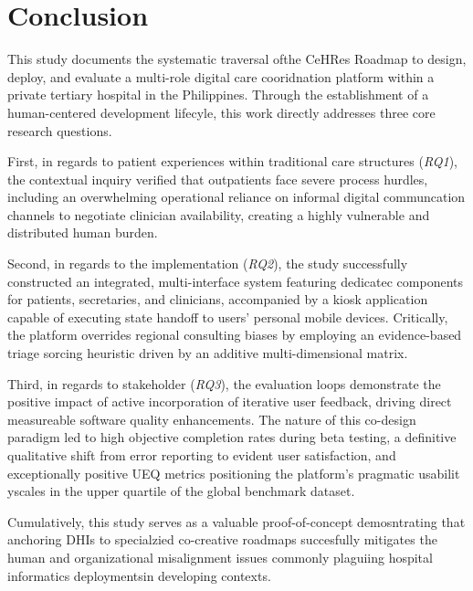 \documentclass[manuscript, screen, review]{acmart}
\begin{document}
\section{Conclusion}
\label{sec:conclusion}
This study documents the systematic traversal ofthe CeHRes Roadmap to design, deploy, and evaluate a multi-role digital care cooridnation platform within a private tertiary hospital in the Philippines. Through the establishment of a human-centered development lifecyle, this work directly addresses three core research questions. 

First, in regards to patient experiences within traditional care structures (\textit{RQ1}), the contextual inquiry verified that outpatients face severe process hurdles, including an overwhelming operational reliance on informal digital communcation channels to negotiate clinician availability, creating a highly vulnerable and distributed human burden. 

Second, in regards to the implementation (\textit{RQ2}), the study successfully constructed an integrated, multi-interface system featuring dedicatec components for patients, secretaries, and clinicians, accompanied by a kiosk application capable of executing state handoff to users' personal mobile devices. Critically, the platform overrides regional consulting biases by employing an evidence-based triage sorcing heuristic driven by an additive multi-dimensional matrix. 

Third, in regards to stakeholder (\textit{RQ3}), the evaluation loops demonstrate the positive impact of active incorporation of iterative user feedback, driving direct measureable software quality enhancements. The nature of this co-design paradigm led to high objective completion rates during beta testing, a definitive qualitative shift from error reporting to evident user satisfaction, and exceptionally positive UEQ metrics positioning the platform's pragmatic usabilit yscales in the upper quartile of the global benchmark dataset. 

Cumulatively, this study serves as a valuable proof-of-concept demosntrating that anchoring DHIs to specialzied co-creative roadmaps succesfully mitigates the human and organizational misalignment issues commonly plaguiing hospital informatics deploymentsin developing contexts. 
\end{document}
